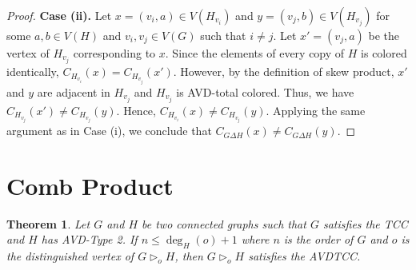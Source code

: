 \documentclass[12pt]{article}
\theoremstyle{definition}
\newtheorem{thm}[defn]{Theorem}
\begin{document}
\begin{proof}
\textbf{Case (ii).} 
Let $x=(v_i,a)\in V(H_{v_i})$ and $y=(v_j,b)\in V(H_{v_j})$ for some $a,b\in V(H)$ and $v_i,v_j\in V(G)$ such that $i\neq j$.
Let
$x'=(v_j,a)$
be the vertex of $H_{v_j}$ corresponding to $x$. Since the elements of every copy of $H$ is colored identically,
$
C_{H_{v_i}}(x)=C_{H_{v_j}}(x').
$
However, by the definition of skew product, $x'$ and $y$ are adjacent in $H_{v_j}$ and $H_{v_j}$ is AVD-total colored. Thus, we have
$
C_{H_{v_j}}(x')\neq C_{H_{v_j}}(y).
$
Hence,
$
C_{H_{v_i}}(x)\neq C_{H_{v_j}}(y).
$
Applying the same argument as in Case (i), we conclude that $C_{G\Delta H}(x)\neq C_{G\Delta H}(y)$.
\end{proof}

\section{Comb Product}

\begin{thm}\label{Theorem 6.1}
{\em Let $G$ and $H$ be two connected graphs such that $G$ satisfies the TCC and $H$ has AVD-Type 2. 
If $n\leq \deg_{H}(o)+1$ where $n$ is the order of $G$ and $o$ is the distinguished vertex of $G\triangleright_o H$, 
then $G\triangleright_o H$ satisfies the AVDTCC.}
\end{thm}
\end{document}
